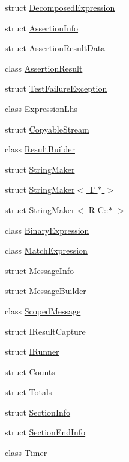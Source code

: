 \begin{DoxyCompactItemize}
struct \hyperlink{structCatch_1_1DecomposedExpression}{Decomposed\-Expression}
\item 
struct \hyperlink{structCatch_1_1AssertionInfo}{Assertion\-Info}
\item 
struct \hyperlink{structCatch_1_1AssertionResultData}{Assertion\-Result\-Data}
\item 
class \hyperlink{classCatch_1_1AssertionResult}{Assertion\-Result}
\item 
struct \hyperlink{structCatch_1_1TestFailureException}{Test\-Failure\-Exception}
\item 
class \hyperlink{classCatch_1_1ExpressionLhs}{Expression\-Lhs}
\item 
struct \hyperlink{structCatch_1_1CopyableStream}{Copyable\-Stream}
\item 
class \hyperlink{classCatch_1_1ResultBuilder}{Result\-Builder}
\item 
struct \hyperlink{structCatch_1_1StringMaker}{String\-Maker}
\item 
struct \hyperlink{structCatch_1_1StringMaker_3_01T_01_5_01_4}{String\-Maker$<$ T $\ast$ $>$}
\item 
struct \hyperlink{structCatch_1_1StringMaker_3_01R_01C_1_1_5_01_4}{String\-Maker$<$ R C\-::$\ast$ $>$}
\item 
class \hyperlink{classCatch_1_1BinaryExpression}{Binary\-Expression}
\item 
class \hyperlink{classCatch_1_1MatchExpression}{Match\-Expression}
\item 
struct \hyperlink{structCatch_1_1MessageInfo}{Message\-Info}
\item 
struct \hyperlink{structCatch_1_1MessageBuilder}{Message\-Builder}
\item 
class \hyperlink{classCatch_1_1ScopedMessage}{Scoped\-Message}
\item 
struct \hyperlink{structCatch_1_1IResultCapture}{I\-Result\-Capture}
\item 
struct \hyperlink{structCatch_1_1IRunner}{I\-Runner}
\item 
struct \hyperlink{structCatch_1_1Counts}{Counts}
\item 
struct \hyperlink{structCatch_1_1Totals}{Totals}
\item 
struct \hyperlink{structCatch_1_1SectionInfo}{Section\-Info}
\item 
struct \hyperlink{structCatch_1_1SectionEndInfo}{Section\-End\-Info}
\item 
class \hyperlink{classCatch_1_1Timer}{Timer}
\item 

\end{DoxyCompactItemize}
